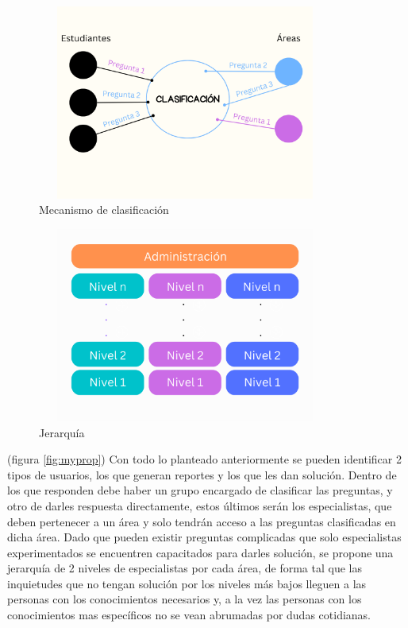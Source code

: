 \begin{figure}[h]
	
	\begin{center}
	\includegraphics[width=9.73cm, height=6.4cm]{clasification.png}
	\caption{Mecanismo de clasificación}
	\label{fig:clasification}
	
\end{center}
\end{figure}


	\begin{figure}[h]
		
		\begin{center}
		\includegraphics[width=9.73cm, height=6.4cm]{hierarchy.png}
		\caption{Jerarquía}
		\label{fig:hierarchy}
		
	\end{center}
	\end{figure}




(figura \ref{fig:myprop}) Con todo lo planteado anteriormente se pueden identificar 2 tipos de usuarios, los que generan reportes y los que les dan solución. Dentro de los que responden debe haber un grupo encargado de clasificar las preguntas, y otro de darles respuesta directamente, estos últimos serán los especialistas, que deben pertenecer a un área y solo tendrán acceso a las preguntas clasificadas en dicha área. Dado que pueden existir preguntas complicadas que solo especialistas experimentados se encuentren capacitados para darles solución, se propone una jerarquía de 2 niveles de especialistas por cada área, de forma tal que las inquietudes que no tengan solución por los niveles más bajos lleguen a las personas con los conocimientos necesarios y, a la vez las personas con los conocimientos mas específicos no se vean abrumadas por dudas cotidianas.
\newline

